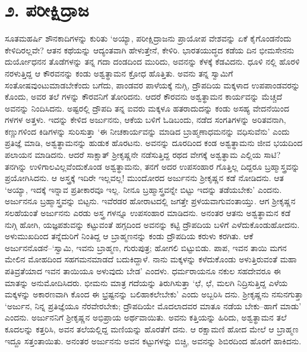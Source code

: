 
\chapter{೨. ಪರೀಕ್ಷಿದ್ರಾಜ}

ಸೂತಮಹರ್ಷಿ ಶೌನಕಾದಿಗಳನ್ನು ಕುರಿತು ‘ಅಯ್ಯಾ, ಪರೀಕ್ಷಿದ್ರಾಜನು ಪ್ರಾಯೋಪ ವೇಶವನ್ನು ಏಕೆ ಕೈಗೊಂಡನೆಂದು ಕೇಳಿದಿರಲ್ಲವೇ? ಆತನ ಕಥೆಯನ್ನು ಆದ್ಯಂತವಾಗಿ ಹೇಳುತ್ತೇನೆ, ಕೇಳಿರಿ. ಭಾರತಯುದ್ಧದ ಕಡೆಯ ದಿನ ಭೀಮಸೇನನು ದುರ್ಯೋಧನನ ತೊಡೆಗಳನ್ನು ತನ್ನ ಗದಾ ದಂಡದಿಂದ ಮುರಿದು, ಅವನನ್ನು ಕೆಳಕ್ಕೆ ಕೆಡವಿದನು. ಧೂಳಿ ನಲ್ಲಿ ಹೊರಳಿ ನರಳುತ್ತಿದ್ದ ಆ ಕೌರವನನ್ನು ಕಂಡು ಅಶ್ವತ್ಥಾಮನ ಕ್ರೋಧ ಹೊತ್ತಿತು. ಅವನು ತನ್ನ ಸ್ವಾಮಿಗೆ ಸಂತೋಷವುಂಟುಮಾಡಬೇಕೆಂದು ಬಗೆದು, ಪಾಂಡವರ ಪಾಳೆಯಕ್ಕೆ ನುಗ್ಗಿ, ದ್ರೌಪದಿಯ ಮಕ್ಕಳಾದ ಉಪಪಾಂಡವರನ್ನು ಕೊಂದು, ಅವರ ತಲೆ ಗಳನ್ನು ಕೌರವನಿಗೆ ತೋರಿದನು. ಆದರೆ ಕೌರವನು ಅಶ್ವತ್ಥಾಮನ ಕಾರ್ಯವನ್ನು ಮೆಚ್ಚದೆ ಅವನನ್ನು ನಿಂದಿಸಿದನು. ಅಷ್ಟರಲ್ಲಿ ದ್ರೌಪದಿ ತನ್ನ ಐವರು ಮಕ್ಕಳೂ ಹತರಾದುದನ್ನು ಕಂಡು ಅಸಹ್ಯ ವೇದನೆಯಿಂದ ಗಳಗಳ ಅತ್ತಳು. ಇದನ್ನು ಕೇಳಿದ ಅರ್ಜುನನು, ಆಕೆಯ ಬಳಿಗೆ ಓಡಿಬಂದು, ನಡೆದ ಸಂಗತಿಗಳನ್ನು ಅರಿತವನಾಗಿ, ಕಣ್ಣುಗಳಿಂದ ಕಿಡಿಗಳನ್ನು ಸುರಿಸುತ್ತಾ ‘ಈ ನೀಚಕಾರ್ಯವನ್ನು ಮಾಡಿದ ಬ್ರಾಹ್ಮಣಾಧಮನನ್ನು ವಧಿಸುವೆನು’ ಎಂದು ಪ್ರತಿಜ್ಞೆ ಮಾಡಿ, ಅಶ್ವತ್ಥಾಮನನ್ನು ಹುಡುಕ ಹೊರಟನು. ಅವನನ್ನು ದೂರದಿಂದ ಕಂಡ ಅಶ್ವತ್ಥಾಮನು ಜೀವ ಭಯದಿಂದ ಪಲಾಯನ ಮಾಡಿದನು. ಆದರೆ ಸಾಕ್ಷಾತ್ ಶ್ರೀಕೃಷ್ಣನೇ ನಡೆಸುತ್ತಿದ್ದ ರಥದ ವೇಗಕ್ಕೆ ಅಶ್ವತ್ಥಾಮ ಎಲ್ಲಿಯ ಸಾಟಿ? ತನಗಿನ್ನು ಉಳಿಗಾಲವಿಲ್ಲವೆಂದುಕೊಂಡ ಅಶ್ವತ್ಥಾಮನು, ತನಗೆ ಅದರ ಉಪಸಂಹಾರ ಗೊತ್ತಿಲ್ಲ ದಿದ್ದರೂ ಬ್ರಹ್ಮಾಸ್ತ್ರವನ್ನು ಪ್ರಯೋಗಿಸಿದನು. ಆ ಅಸ್ತ್ರಕ್ಕೆ ಇದಿರೇ ಇಲ್ಲವಲ್ಲ! ಮುಂದೋರದ ಅರ್ಜುನನು ಶ್ರೀಕೃಷ್ಣನ ಕಡೆ ನೋಡಿದನು. ಆತ ‘ಅಯ್ಯಾ, ಇದಕ್ಕೆ ಇನ್ನಾವ ಪ್ರತೀಕಾರವೂ ಇಲ್ಲ. ನೀನೂ ಬ್ರಹ್ಮಾಸ್ತ್ರವನ್ನೇ ಬಿಟ್ಟು ಇದನ್ನು ತಡೆಯಬೇಕು’ ಎಂದನು. ಅರ್ಜುನನೂ ಬ್ರಹ್ಮಾಸ್ತ್ರವನ್ನು ಬಿಟ್ಟನು. ಇವೆರಡರ ಹೋರಾಟದಲ್ಲಿ ಜಗತ್ತೇ ಪ್ರಳಯವಾಗುವಂತಾಯ್ತು. ಆಗ ಶ್ರೀಕೃಷ್ಣನ ಸಲಹೆಯಂತೆ ಅರ್ಜುನನು ಎರಡು ಅಸ್ತ್ರ ಗಳನ್ನೂ ಉಪಸಂಹಾರ ಮಾಡಿದನು. ಅನಂತರ ಆತನು ಅಶ್ವತ್ಥಾಮನ ಕಡೆ ನುಗ್ಗಿ ಹೋಗಿ, ಯಜ್ಞಪಶುವನ್ನು ಕಟ್ಟುವಂತೆ ಹಗ್ಗದಿಂದ ಅವನನ್ನು ಕಟ್ಟಿ ದ್ರೌಪದಿಯ ಬಳಿಗೆ ಎಳೆದುಕೊಂಡುಹೋದನು. ಅಳುಮುಖದಿಂದ ತನ್ನೆದುರಿಗೆ ನಿಂತಿದ್ದ ಆ ಬ್ರಾಹ್ಮಣನನ್ನು ಕಂಡು ದ್ರೌಪದಿಯ ಕರುಳು ಕರಗಿತು. ಆಕೆ ಅರ್ಜುನನೊಡನೆ–‘ಸ್ವಾಮಿ, ಇವನು ಬ್ರಾಹ್ಮಣ, ಗುರುಪುತ್ರ; ಹೋಗಲಿ ಬಿಟ್ಟುಬಿಡು. ಪಾಪ, ಇವನ ತಾಯಿ ಮಗನ ಮೇಲಿನ ಮೋಹದಿಂದ ಸಹಗಮನಮಾಡದೆ ಬದುಕಿದ್ದಾಳೆ. ನಾನು ಮಕ್ಕಳನ್ನು ಕಳೆದುಕೊಂಡು ಅಳುತ್ತಿರುವಂತೆ ಮಹಾ ಪತಿವ್ರತೆಯಾದ ಇವನ ತಾಯಿಯೂ ಅಳುವುದು ಬೇಡ’ ಎಂದಳು. ಧರ್ಮರಾಯನೂ ನಕುಲ ಸಹದೇವರೂ ಈ ಮಾತನ್ನು ಅನುಮೋದಿಸಿದರು. ಭೀಮನು ಮಾತ್ರ ಗದೆಯನ್ನು ತಿರುಗಿಸುತ್ತಾ ‘ಛೆ, ಛೆ, ಮಲಗಿ ನಿದ್ರಿಸುತ್ತಿದ್ದ ಎಳೆಯ ಮಕ್ಕಳನ್ನು ಅಕಾರಣವಾಗಿ ಕೊಂದ ಈ ಭ್ರಷ್ಟನನ್ನು ಬಲಿಹಾಕಲೇಬೇಕು’ ಎಂದು ಅಬ್ಬರಿಸಿ ದನು. ಶ್ರೀಕೃಷ್ಣನು ನಸುನಗುತ್ತಾ ‘ಅರ್ಜುನ, ನಿನ್ನ ಪ್ರತಿಜ್ಞೆಯೂ ನೆರವೇರಬೇಕು; ದ್ರೌಪದಿಯೇ ಮೊದಲಾದವರ ಮಾತೂ ನಡೆಯ ಬೇಕು–ಹಾಗೆ ಮಾಡು’ ಎಂದನು. ಅರ್ಜುನನಿಗೆ ಶ್ರೀಕೃಷ್ಣನ ಅಭಿಪ್ರಾಯ ಅರ್ಥವಾಯಿತು. ಅವನು ಕತ್ತಿಯನ್ನು ಹಿರಿದು, ಅಶ್ವತ್ಥಾಮನ ತಲೆ ಕೂದಲನ್ನು ಕತ್ತರಿಸಿ, ಅವನ ತಲೆಯಲ್ಲಿದ್ದ ಮಣಿಯನ್ನು ಹೊರತೆಗೆ ದನು. ಆ ರಕ್ಷಾಮಣಿ ಹೋದ ಮೇಲೆ ಆ ಬ್ರಾಹ್ಮಣ ಇದ್ದೂ ಸತ್ತಂತಾಯಿತು. ಅನಂತರ ಅರ್ಜುನನು ಅವನ ಕಟ್ಟುಗಳನ್ನು ಬಿಚ್ಚಿ, ಅವನನ್ನು ಶಿಬಿರದಿಂದ ಹೊರಗೆ ಹಾಕಿದನು.

